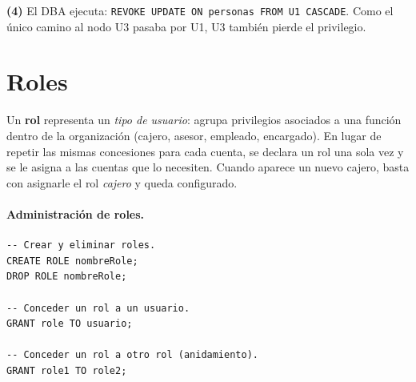 \documentclass[11pt,a4paper]{article}
\begin{document}
\begin{center}
\end{center}

\textbf{(4)} El DBA ejecuta:
\texttt{REVOKE UPDATE ON personas FROM U1 CASCADE}.
Como el único camino al nodo U3 pasaba por U1, U3 también pierde el
privilegio.

\begin{center}
\end{center}

\section{Roles}

Un \textbf{rol} representa un \emph{tipo de usuario}: agrupa privilegios
asociados a una función dentro de la organización (cajero, asesor,
empleado, encargado). En lugar de repetir las mismas concesiones para
cada cuenta, se declara un rol una sola vez y se le asigna a las cuentas
que lo necesiten. Cuando aparece un nuevo cajero, basta con asignarle
el rol \emph{cajero} y queda configurado.

\paragraph{Administración de roles.}

\begin{lstlisting}
-- Crear y eliminar roles.
CREATE ROLE nombreRole;
DROP ROLE nombreRole;

-- Conceder un rol a un usuario.
GRANT role TO usuario;

-- Conceder un rol a otro rol (anidamiento).
GRANT role1 TO role2;
\end{lstlisting}
\end{document}
